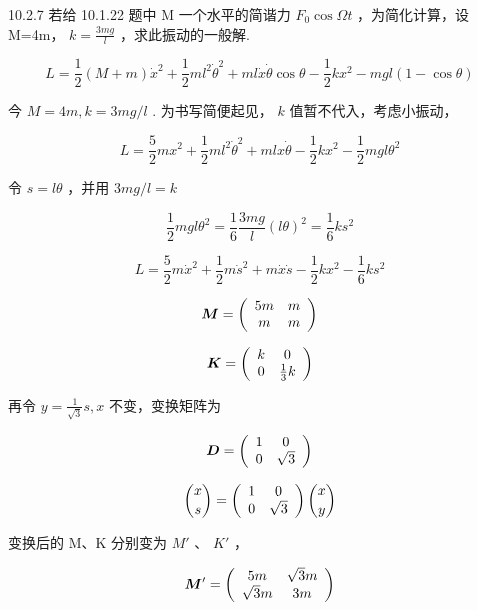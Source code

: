 \begin{problem}{10.2.7}
若给 10.1.22 题中 M 一个水平的简谐力 $F_{0}\cos\Omega t$ ，为简化计算，设 M=4m， $k=\frac{3mg}{l}$ ，求此振动的一般解.

\[
L = \frac {1}{2} (M + m) \dot {x} ^ {2} + \frac {1}{2} m l ^ {2} \dot {\theta} ^ {2} + m l \dot {x} \dot {\theta} \cos \theta - \frac {1}{2} k x ^ {2} - m g l (1 - \cos \theta)
\]

今 $M = 4m, k = 3mg / l$ . 为书写简便起见， $k$ 值暂不代入，考虑小振动，

\[
L = \frac {5}{2} m x ^ {2} + \frac {1}{2} m l ^ {2} \dot {\theta} ^ {2} + m l x \dot {\theta} - \frac {1}{2} k x ^ {2} - \frac {1}{2} m g l \theta^ {2}
\]

令 $s = l\theta$ ，并用 $3mg / l = k$ 

\[
\frac {1}{2} m g l \theta^ {2} = \frac {1}{6} \frac {3 m g}{l} (l \theta) ^ {2} = \frac {1}{6} k s ^ {2}
\]

\[
L = \frac {5}{2} m \dot {x} ^ {2} + \frac {1}{2} m \dot {s} ^ {2} + m \dot {x} \dot {s} - \frac {1}{2} k x ^ {2} - \frac {1}{6} k s ^ {2}
\]

\[
\boldsymbol {M} = \left( \begin{array}{c c} 5 m & m \\ m & m \end{array} \right)
\]

\[
\boldsymbol {K} = \left( \begin{array}{c c} k & 0 \\ 0 & \frac {1}{3} k \end{array} \right)
\]

再令 $y = \frac{1}{\sqrt{3}} s, x$ 不变，变换矩阵为

\[
\boldsymbol {D} = \left( \begin{array}{c c} 1 & 0 \\ 0 & \sqrt {3} \end{array} \right)
\]

\[
\binom {x} {s} = \left( \begin{array}{c c} 1 & 0 \\ 0 & \sqrt {3} \end{array} \right) \binom {x} {y}
\]

变换后的 M、K 分别变为 $M'$ 、 $K'$ ，

\[
\boldsymbol {M} ^ {\prime} = \left( \begin{array}{c c} 5 m & \sqrt {3} m \\ \sqrt {3} m & 3 m \end{array} \right)
\]


\end{problem}
